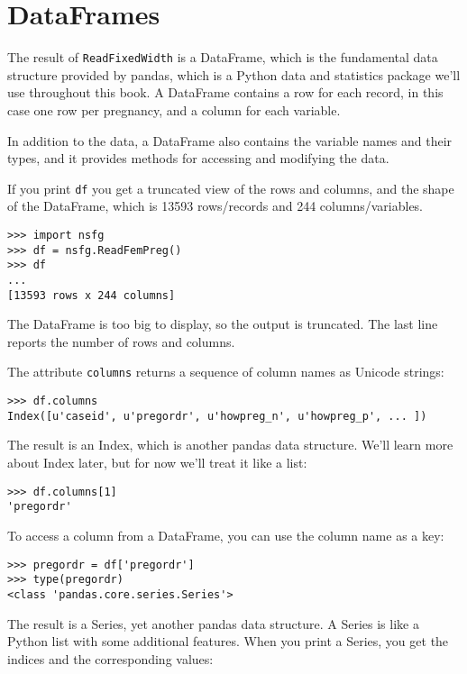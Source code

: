 \documentclass[12pt]{book}
\begin{document}
\section{DataFrames}
\label{dataframe}

The result of {\tt ReadFixedWidth} is a DataFrame, which is the
fundamental data structure provided by pandas, which is a Python
data and statistics package we'll use throughout this book.
A DataFrame contains a
row for each record, in this case one row per pregnancy, and a column
for each variable.

In addition to the data, a DataFrame also contains the variable
names and their types, and it provides methods for accessing and modifying
the data.

If you print {\tt df} you get a truncated view of the rows and
columns, and the shape of the DataFrame, which is 13593
rows/records and 244 columns/variables.

\begin{verbatim}
>>> import nsfg
>>> df = nsfg.ReadFemPreg()
>>> df
...
[13593 rows x 244 columns]
\end{verbatim}

The DataFrame is too big to display, so the output is truncated.  The
last line reports the number of rows and columns.

The attribute {\tt columns} returns a sequence of column
names as Unicode strings:

\begin{verbatim}
>>> df.columns
Index([u'caseid', u'pregordr', u'howpreg_n', u'howpreg_p', ... ])
\end{verbatim}

The result is an Index, which is another pandas data structure.  
We'll learn more about Index later, but for
now we'll treat it like a list:

\begin{verbatim}
>>> df.columns[1]
'pregordr'
\end{verbatim}

To access a column from a DataFrame, you can use the column
name as a key:

\begin{verbatim}
>>> pregordr = df['pregordr']
>>> type(pregordr)
<class 'pandas.core.series.Series'>
\end{verbatim}

The result is a Series, yet another pandas data structure.
A Series is like a Python list with some additional features.
When you print a Series, you get the indices and the
corresponding values:
\end{document}
